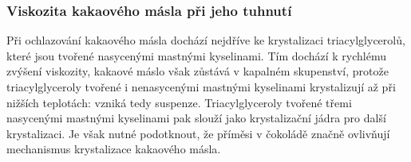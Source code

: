 \documentclass[12pt]{article}
\begin{document}
\subsubsection{Viskozita kakaového másla při jeho tuhnutí}

Při ochlazování kakaového másla dochází nejdříve ke krystalizaci triacylglycerolů, které jsou tvořené nasycenými mastnými kyselinami. Tím dochází k rychlému zvýšení viskozity, kakaové máslo však zůstává v kapalném skupenství, protože triacylglyceroly tvořené i nenasycenými mastnými kyselinami krystalizují až při nižších teplotách: vzniká tedy suspenze. Triacylglyceroly tvořené třemi nasycenými mastnými kyselinami pak slouží jako krystalizační jádra pro další krystalizaci. Je však nutné podotknout, že příměsi v čokoládě značně ovlivňují mechanismus krystalizace kakaového másla.~\cite{Article:precrystallization}
\end{document}
